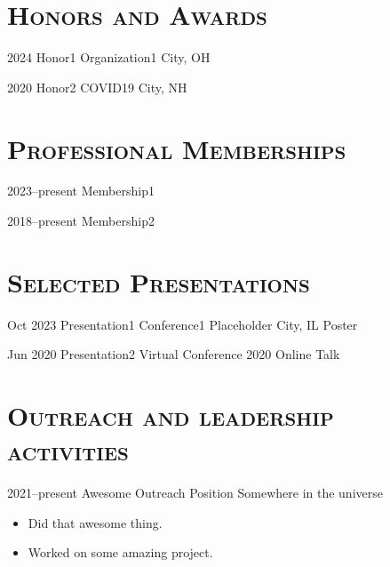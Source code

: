 \documentclass[letterpaper,11pt,twoside]{evo_cv}
\begin{document}

\nocite{*}{ \printbibliography[title={\textsc{Publications}}] }


\section{\textsc{Honors and Awards}}

  \cvhonors
    {2024}
    {Honor1}
    {Organization1}
    {City, OH}

  \cvhonors
    {2020}
    {Honor2}
    {COVID19}
    {City, NH}


\section{\textsc{Professional Memberships} }

  \cvmembership
    {2023--present}
    {Membership1}

  \cvmembership
    {2018--present}
    {Membership2}



\section{\textsc{Selected Presentations}}

  \cvtalk
    {Oct 2023}
    {Presentation1}
    {Conference1}
    {Placeholder City, IL}
    {Poster}

  \cvtalk 
    {Jun 2020}
    {Presentation2}
    {Virtual Conference 2020}
    {Online} 
    {Talk}

\section{\textsc{Outreach and leadership activities} }

  \cvoutreach
    {2021--present}
    {Awesome Outreach Position}
    {Somewhere in the universe}
    {
      {
        \begin{itemize}[leftmargin=0.6cm, label={\textbullet}, before=\vspace{-1pt}, after=\vspace{3pt}]
	  \item Did that awesome thing.
	  \item Worked on some amazing project.
	\end{itemize}
      }
    }
\end{document}
